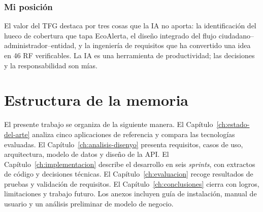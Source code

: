 \subsubsection*{Mi posición}
  El valor del TFG destaca por tres cosas que la IA no aporta: la identificación del hueco de cobertura que tapa EcoAlerta, el diseño integrado del flujo ciudadano--administrador--entidad, y la ingeniería de requisitos que ha convertido una idea en 46 RF verificables. La IA es una herramienta de productividad; las decisiones y la responsabilidad son mías.


\section{Estructura de la memoria}
\label{sec:estructura-memoria}

El presente trabajo se organiza de la siguiente manera. El Capítulo~\ref{ch:estado-del-arte} analiza cinco aplicaciones de referencia y compara las tecnologías evaluadas. El Capítulo~\ref{ch:analisis-disenyo} presenta requisitos, casos de uso, arquitectura, modelo de datos y diseño de la API. El Capítulo~\ref{ch:implementacion} describe el desarrollo en seis \textit{sprints}, con extractos de código y decisiones técnicas. El Capítulo~\ref{ch:evaluacion} recoge resultados de pruebas y validación de requisitos. El Capítulo~\ref{ch:conclusiones} cierra con logros, limitaciones y trabajo futuro. Los anexos incluyen guía de instalación, manual de usuario y un análisis preliminar de modelo de negocio.
